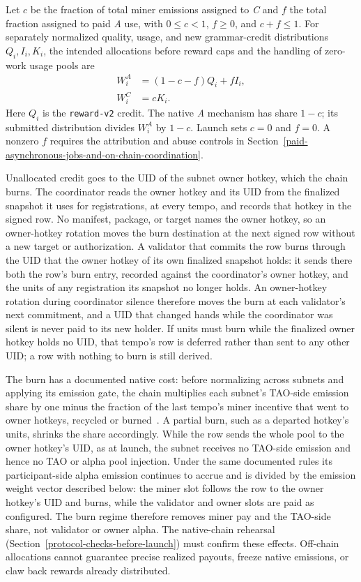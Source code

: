 Let \(c\) be the fraction of total miner emissions assigned to \textit{C} and
\(f\) the total fraction assigned to paid \textit{A} use, with
\(0\leq c<1\), \(f\geq0\), and \(c+f\leq1\). For separately normalized
quality, usage, and new grammar-credit distributions \(Q_i,I_i,K_i\), the
intended allocations before reward caps and the handling of zero-work usage
pools are
\begin{align}\label{eq:mechanism-allocation}
 W^A_i&=(1-c-f)Q_i+fI_i,\\
 W^C_i&=cK_i.
\end{align}
Here \(Q_i\) is the \texttt{reward-v2} credit. The native \textit{A} mechanism has
share \(1-c\); its submitted distribution divides \(W^A_i\) by \(1-c\). Launch
sets \(c=0\) and \(f=0\). A nonzero \(f\) requires the attribution and abuse
controls in Section~\ref{paid-asynchronous-jobs-and-on-chain-coordination}.

Unallocated credit goes to the UID of the subnet owner hotkey, which the chain
burns. The coordinator reads the owner hotkey and its UID from the finalized
snapshot it uses for registrations, at every tempo, and records that hotkey in
the signed row. No manifest, package, or target names the owner hotkey, so an
owner-hotkey rotation moves the burn destination at the next signed row without
a new target or authorization. A validator that commits the row
burns through the UID that the owner hotkey of its own finalized snapshot
holds: it sends there both the row's burn entry, recorded against the
coordinator's owner hotkey, and the units of any registration its snapshot no
longer holds. An owner-hotkey rotation during coordinator silence therefore
moves the burn at each validator's next commitment, and a UID that changed
hands while the coordinator was silent is never paid to its new holder. If units must burn while the finalized owner
hotkey holds no UID, that tempo's row is deferred rather than sent to any other
UID; a row with nothing to burn is still derived.

The burn has a documented native cost: before normalizing across subnets and
applying its emission gate, the chain multiplies each subnet's TAO-side emission
share by one minus the fraction of the last tempo's miner incentive that went to
owner hotkeys, recycled or burned~\cite{btemissions}. A partial burn, such as a
departed hotkey's units, shrinks the share accordingly. While the row sends the
whole pool to the owner hotkey's UID, as at launch, the subnet receives no
TAO-side emission and hence no TAO or alpha pool injection. Under the same
documented rules its participant-side alpha emission continues to accrue and is
divided by the emission weight vector described below: the miner slot follows
the row to the owner hotkey's UID and burns, while the validator and owner
slots are paid as configured. The burn regime therefore removes miner pay and
the TAO-side share, not validator or owner alpha. The native-chain rehearsal
(Section~\ref{protocol-checks-before-launch}) must confirm these effects.
Off-chain allocations cannot guarantee precise realized payouts, freeze native
emissions, or claw back rewards already distributed.

